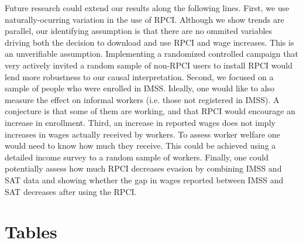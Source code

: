 \documentclass[oneside,11pt]{article}
\begin{document}
Future research could extend our results along the following lines. First, we use naturally-ocurring variation in the use of RPCI. Although we show trends are parallel, our identifying assumption is that there are no ommited variables driving both the decision to download and use RPCI and wage increases. This is an unverifiable assumption. Implementing a randomized controlled campaign that very actively invited a random sample of non-RPCI users to install RPCI would lend more robustness to our causal interpretation. Second, we focused on a sample of people who were enrolled in IMSS. Ideally, one would like to also measure the effect on informal workers (i.e. those not registered in IMSS). A conjecture is that some of them are working, and that RPCI would encourage an increase in enrollment. Third, an increase in reported wages does not imply increases in wages actually received by workers. To assess worker welfare one would need to know how much they receive. This could be achieved using a detailed income survey to a random sample of workers. Finally, one could potentially assess how much RPCI decreases evasion by combining IMSS and SAT data and showing whether the gap in wages reported between IMSS and SAT decreases after using the RPCI. 





\newpage


\clearpage

%
%
%




\clearpage
\singlespacing

\section{Tables}
\end{document}
